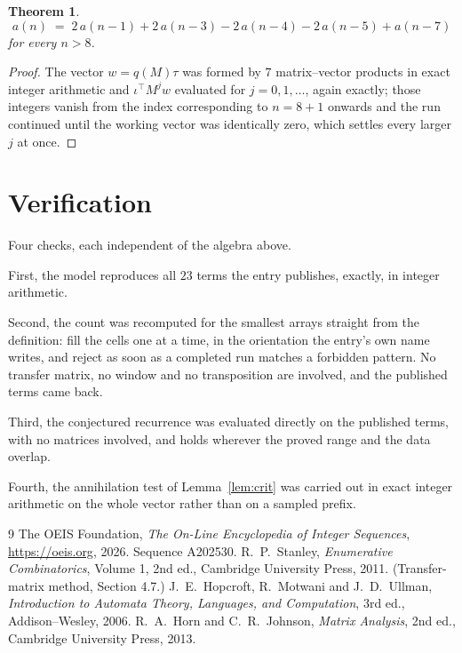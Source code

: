\documentclass[11pt,a4paper]{article}
\theoremstyle{plain}
\newtheorem{theorem}{Theorem}
\theoremstyle{definition}
\begin{document}
\begin{theorem}
\[
a(n)\;=\;2\,a(n-1) + 2\,a(n-3) - 2\,a(n-4) - 2\,a(n-5) + a(n-7)
\]
for every $n>8$.
\end{theorem}

\begin{proof}
The vector $w=q(M)\tau$ was formed by $7$ matrix--vector products in exact integer
arithmetic and $\iota^{\!\top}M^{j}w$ evaluated for $j=0,1,\dots$, again exactly; those
integers vanish from the index corresponding to $n=8+1$ onwards and the run continued
until the working vector was identically zero, which settles every larger $j$ at once.
\end{proof}

\section{Verification}

Four checks, each independent of the algebra above.

First, the model reproduces all $23$ terms the entry publishes, exactly, in integer
arithmetic.

Second, the count was recomputed for the smallest arrays straight from the definition: fill the
cells one at a time, in the orientation the entry's own name writes, and reject as soon as a
completed run matches a forbidden pattern. No transfer matrix, no window and no transposition
are involved, and the published terms came back.

Third, the conjectured recurrence was evaluated directly on the published terms, with no
matrices involved, and holds wherever the proved range and the data overlap.

Fourth, the annihilation test of Lemma~\ref{lem:crit} was carried out in exact integer
arithmetic on the whole vector rather than on a sampled prefix.

\begin{thebibliography}{9}
 The OEIS Foundation, \emph{The On-Line Encyclopedia of Integer
Sequences}, \url{https://oeis.org}, 2026. Sequence A202530.
 R.~P.~Stanley, \emph{Enumerative Combinatorics}, Volume 1, 2nd ed.,
Cambridge University Press, 2011. (Transfer-matrix method, Section 4.7.)
 J.~E.~Hopcroft, R.~Motwani and J.~D.~Ullman, \emph{Introduction to Automata
Theory, Languages, and Computation}, 3rd ed., Addison--Wesley, 2006.
 R.~A.~Horn and C.~R.~Johnson, \emph{Matrix Analysis}, 2nd ed., Cambridge
University Press, 2013.
\end{thebibliography}
\end{document}
